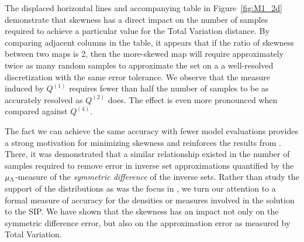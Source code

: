 The displaced horizontal lines and accompanying table in Figure~\ref{fig:M1_2d} demonstrate that skewness has a direct impact on the number of samples required to achieve a particular value for the Total Variation distance.
By comparing adjacent columns in the table, it appears that if the ratio of skewness between two maps is 2, then the more-skewed map will require approximately twice as many random samples to approximate the set on a a well-resolved discretization with the same error tolerance.
We observe that the measure induced by $Q^{(1)}$ requires fewer than half the number of samples to be as accurately resolved as $Q^{(2)}$ does.
The effect is even more pronounced when compared against $Q^{(4)}$.

The fact we can achieve the same accuracy with fewer model evaluations provides a strong motivation for minimizing skewness and reinforces the results from \cite{BPW_2015}.
There, it was demonstrated that a similar relationship existed in the number of samples required to remove error in inverse set approximations quantified by the $\mu_{\Lambda}$-measure of the {\em symmetric difference} of the inverse sets.
Rather than study the support of the distributions as was the focus in \cite{BPW_2015}, we turn our attention to a formal measure of accuracy for the densities or measures involved in the solution to the SIP.
We have shown that the skewness has an impact not only on the symmetric difference error, but also on the approximation error as measured by Total Variation.
